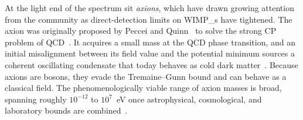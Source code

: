 At the light end of the spectrum sit \emph{axions}, which have drawn growing attention from the community as direct-detection limits on \glspl{WIMP_} have tightened.
The axion was originally proposed by Peccei and Quinn~\cite{Peccei:1977hh} to solve the strong CP problem of QCD~\cite{Weinberg:1977ma,Wilczek:1977pj}.
It acquires a small mass at the QCD phase transition, and an initial misalignment between its field value and the potential minimum sources a coherent oscillating condensate that today behaves as cold dark matter~\cite{Preskill:1982cy,Abbott:1982af,Dine:1982ah}.
Because axions are bosons, they evade the Tremaine--Gunn bound and can behave as a classical field.
The phenomenologically viable range of axion masses is broad, spanning roughly $10^{-12}$ to $10^{7}$~eV once astrophysical, cosmological, and laboratory bounds are combined~\cite{Adams:2022pbo, ciaran_o_hare_2020_3932430}.



